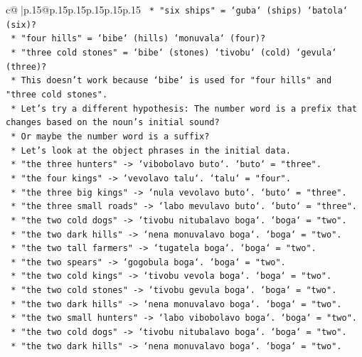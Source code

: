 \documentclass{article}
\begin{document}
{\begin{supertabular}{c@{$\;$}|p{.15\linewidth}@{}p{.15\linewidth}p{.15\linewidth}p{.15\linewidth}p{.15\linewidth}p{.15\linewidth}}
{{{\texttt{    *   "six ships" = `guba` (ships) `batola` (six)?} \\
\texttt{    *   "four hills" = `bibe` (hills) `monuvala` (four)?} \\
\texttt{    *   "three cold stones" = `bibe` (stones) `tivobu` (cold) `gevula` (three)?} \\
\texttt{    *   This doesn't work because `bibe` is used for "four hills" and "three cold stones".} \\
\texttt{    *   Let's try a different hypothesis: The number word is a prefix that changes based on the noun's initial sound?} \\
\texttt{    *   Or maybe the number word is a suffix?} \\
\texttt{    *   Let's look at the object phrases in the initial data.} \\
\texttt{        *   "the three hunters" {-}> `vibobolavo buto`. `buto` = "three".} \\
\texttt{        *   "the four kings" {-}> `vevolavo talu`. `talu` = "four".} \\
\texttt{        *   "the three big kings" {-}> `nula vevolavo buto`. `buto` = "three".} \\
\texttt{        *   "the three small roads" {-}> `labo mevulavo buto`. `buto` = "three".} \\
\texttt{        *   "the two cold dogs" {-}> `tivobu nitubalavo boga`. `boga` = "two".} \\
\texttt{        *   "the two dark hills" {-}> `nena monuvalavo boga`. `boga` = "two".} \\
\texttt{        *   "the two tall farmers" {-}> `tugatela boga`. `boga` = "two".} \\
\texttt{        *   "the two spears" {-}> `gogobula boga`. `boga` = "two".} \\
\texttt{        *   "the two cold kings" {-}> `tivobu vevola boga`. `boga` = "two".} \\
\texttt{        *   "the two cold stones" {-}> `tivobu gevula boga`. `boga` = "two".} \\
\texttt{        *   "the two dark hills" {-}> `nena monuvalavo boga`. `boga` = "two".} \\
\texttt{        *   "the two small hunters" {-}> `labo vibobolavo boga`. `boga` = "two".} \\
\texttt{        *   "the two cold dogs" {-}> `tivobu nitubalavo boga`. `boga` = "two".} \\
\texttt{        *   "the two dark hills" {-}> `nena monuvalavo boga`. `boga` = "two".} \\
}}}
\end{supertabular}}
\end{document}
